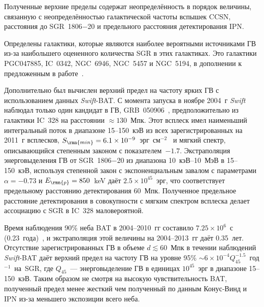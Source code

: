 Полученные верхние пределы содержат неопределённость в порядок величины, связанную с
неопределённостью галактической частоты вспышек CCSN, расстояния до SGR~1806$-$20 и
предельного расстояния детектирования IPN.

Определены галактики, которые являются наиболее вероятными источниками ГВ 
из-за наибольшего оцененного количества SGR в этих галактиках. Это галактики
PGC047885, IC~0342, NGC~6946, NGC~5457 и NGC~5194, в дополнении к предложенным 
в работе~\citet{Popov2006}.

Дополнительно был вычислен верхний предел на частоту ярких ГВ с использованием 
данных \textit{Swift}-BAT. С момента запуска в ноябре 2004~г \textit{Swift} наблюдал 
только один кандидат в ГВ, GRB~050906~\citep{Levan2008}, предположительно из 
галактики IC~328 на расстоянии $\approx 130$~Мпк. Этот всплеск имел наименьший 
интегральный поток в диапазоне 15--150~кэВ из всех зарегистрированных на 2011~г всплесков, 
$S_{\rmn{min}} = 6.1\times10^{-9}$~эрг~см$^{-2}$~\citep{Sakamoto2011ApJS} и 
мягкий спектр, описывающийся степенным законом с показателем~$-1.7$. Экстраполяция 
энерговыделения ГВ от SGR~1806$-$20 из диапазона 10~кэВ--10~МэВ в 15--150~кэВ, 
используя степенной закон с экспоненциальным завалом с параметрами $\alpha=-0.73$ 
и $E_{\rmn{p}}=850$~keV даёт $2.5\times10^{45}$~эрг, что соответствует предельному 
расстоянию детектирования 60~Мпк. Полученное предельное расстояние детектирования 
в совокупности с мягким спектром всплеска делает ассоциацию с SGR в IC~328 маловероятной.

Время наблюдения 90\% неба BAT в 2004--2010~гг 
составило $7.25\times10^{6}$~с (0.23~года)~\citep{Baumgartner2013ApJS}, и экстраполяция 
этой величины на 2004--2013~гг даёт 0.35~лет. Отсутствие зарегистрированных ГВ в 
объеме $d \lesssim 60$~Мпк в течении наблюдений \textit{Swift}-BAT даёт верхний предел 
на частоту ГВ на уровне 95\% $\sim 6 \times 10^{-4} Q_{45}^{-1.5} $~год$^{-1}$~на~SGR, 
где $Q_{45}$~--- энерговыделение ГВ в единицах $10^{45}$~эрг в диапазоне 15--150~кэВ. 
Таким образом не смотря на высокую чувствительность BAT, полученный предел 
менее жесткий чем полученный по данным Конус-Винд и IPN из-за меньшего экспозиции всего неба.

\clearpage